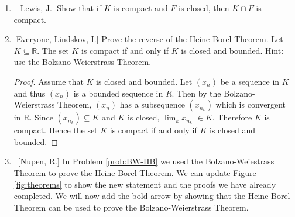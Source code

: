\documentclass[10pt]{article}
\theoremstyle{definition}
\begin{document}
\begin{enumerate}
\item  ~[Lewis, J.] Show that if $K$ is compact and $F$ is closed, then $K \cap F$ is compact.
	
	
\item\label{prob:BW-HB}  [Everyone, Lindskov, I.] Prove the reverse of the Heine-Borel Theorem.  Let $K \subseteq \mathbb{R}$.  The set $K$ is compact if and only if $K$ is closed and bounded.  Hint: use the Bolzano-Weierstrass Theorem.
\begin{proof}
Assume that $K$ is closed and bounded.  Let $(x_n)$ be a sequence in $K$ and thus $(x_n)$ is a bounded sequence in $R$.  Then by the Bolzano-Weierstrass Theorem, $(x_n)$ has a subsequence $(x_{n_k})$ which is convergent in R.  Since $(x_{n_k})\subseteq K$ and $K$ is closed, \(\lim_{k} x_{n_k}\)  $\in K.$  Therefore $K$ is compact.  Hence the set $K$ is compact if and only if $K$ is closed and bounded.

 \end{proof}

\item\label{prob:HB-BW}  ~[Nupen, R.] In Problem \ref{prob:BW-HB} we used the Bolzano-Weiestrass Theorem to prove the Heine-Borel Theorem.  We can update Figure \ref{fig:theorems} to show the new statement and the proofs we have already completed.  We will now add the bold arrow by showing that the Heine-Borel Theorem can be used to prove the Bolzano-Weierstrass Theorem.

	\begin{figure}[h]
	\begin{center}
\end{center}
\end{figure}
\end{enumerate}
\end{document}

